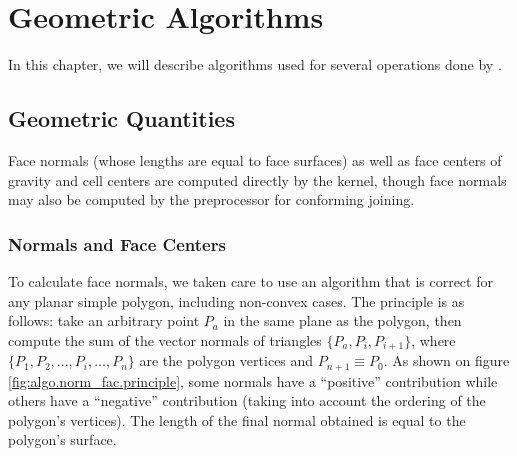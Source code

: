 %
%
%
%
%
%
%

\nopagebreak
\section{Geometric Algorithms\label{sec:algo}}

In this chapter, we will describe algorithms used for several
operations done by \CS.

\subsection{Geometric Quantities\label{sec:geo_quant}}

Face normals (whose lengths are equal to face surfaces) as well
as face centers of gravity and cell centers are computed directly
by the kernel, though face normals may also be computed by the
preprocessor for conforming joining.

\subsubsection{Normals and Face Centers%
                \label{sec:geo_quant.normal}}

To calculate face normals, we taken care to use an algorithm
that is correct for any planar simple polygon, including non-convex cases.
The principle is as follows: take an arbitrary point $P_a$ in the
same plane as the polygon, then compute the sum of the vector normals
of triangles $\{P_a, P_i, P_{i+1}\}$, where $\{P_1, P_2, ..., P_i, ..., P_n\}$
are the polygon vertices and $P_{n+1} \equiv P_0$. As shown on figure
\ref{fig:algo.norm_fac.principle}, some normals have a ``positive''
contribution while others have a ``negative'' contribution (taking into
account the ordering of the polygon's vertices). The length of the final normal
obtained is equal to the polygon's surface.

